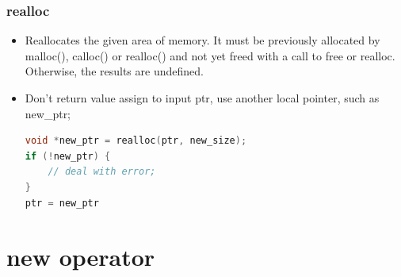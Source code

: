 \documentclass[a4paper,12pt,twoside]{book}
\begin{document}
\subsubsection{realloc}
\begin{itemize}
	
	\item Reallocates the given area of memory. It must be previously allocated by malloc(), calloc() or realloc() and not yet freed with a call to free or realloc. Otherwise, the results are undefined.
	
	
	\item Don't return value assign to input ptr, use another local pointer, such as new\_ptr;
\begin{lstlisting}[frame=single, language=c++]
void *new_ptr = realloc(ptr, new_size);
if (!new_ptr) {
	// deal with error;
}
ptr = new_ptr
\end{lstlisting}
\end{itemize}


\section{new operator}
\end{document}
